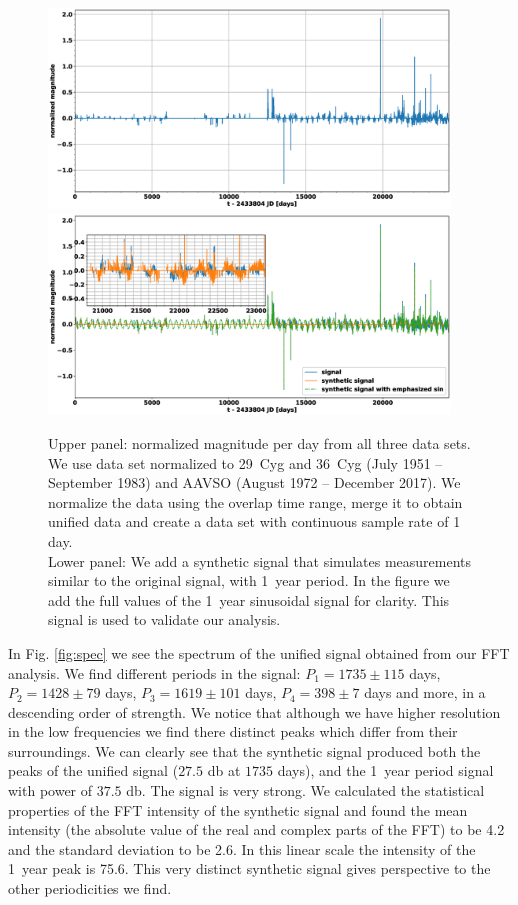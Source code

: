 \documentclass[twocolumn]{aastex62}
\begin{document}
\begin{figure}
\includegraphics[width=0.95\textwidth]{m_vs_t.eps}
\includegraphics[width=0.95\textwidth]{m_vs_t_synth.eps}
\caption{Upper panel: normalized magnitude per day from all three data sets. We use data set normalized to 29~Cyg and 36~Cyg (July 1951 -- September 1983) and AAVSO (August 1972 -- December 2017). We normalize the data using the overlap time range, merge it to obtain unified data and create a data set with continuous sample rate of 1 day.\\
Lower panel: We add a synthetic signal that simulates measurements similar to the original signal, with 1~year period. In the figure we add the full values of the 1~year sinusoidal signal for clarity. This signal is used to validate our analysis.
}
\label{fig:m_vs_t}
\end{figure}

In Fig. \ref{fig:spec} we see the spectrum of the unified signal obtained from our FFT analysis.
We find different periods in the signal: $P_1=1735 \pm 115$ days, $P_2=1428 \pm 79$ days, $P_3=1619 \pm 101$ days, $P_4=398 \pm 7$ days and more, in a descending order of strength.
We notice that although we have higher resolution in the low frequencies we find there distinct peaks which differ from their surroundings.
We can clearly see that the synthetic signal produced both the peaks of the unified signal ($27.5$ db at $1735$ days), and the 1~year period signal with power of $37.5$ db. The signal is very strong.
We calculated the statistical properties of the FFT intensity of the synthetic signal and found the mean intensity (the absolute value of the real and complex parts of the FFT) to be 4.2 and the standard deviation to be 2.6.
In this linear scale the intensity of the 1~year peak is 75.6.
This very distinct synthetic signal gives perspective to the other periodicities we find.
\end{document}
